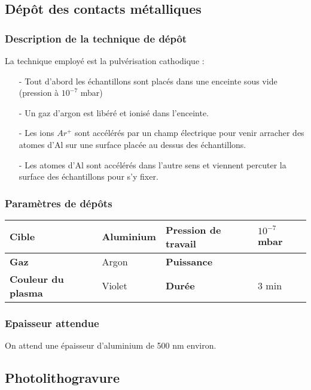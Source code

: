 \documentclass[11pt]{article}
\begin{document}
\subsection{D\'ep\^ot des contacts m\'etalliques}

\subsubsection{Description de la technique de d\'ep\^ot} 

La technique employ\'e est la pulv\'erisation cathodique :
\begin{itemize} \itemsep -2pt
\item[-] Tout d'abord les \'echantillons sont plac\'es dans une enceinte sous vide (pression \`a $10^{-7}$ mbar)
\item[-] Un gaz d'argon est lib\'er\'e et ionis\'e dans l'enceinte. 
\item[-] Les ions $Ar^{+}$ sont acc\'el\'er\'es par un champ \'electrique pour venir arracher des atomes d'Al sur une surface plac\'ee au dessus des \'echantillons. 
\item[-] Les atomes d'Al sont acc\'el\'er\'es dans l'autre sens et viennent percuter la surface des \'echantillons pour s'y fixer.
\end{itemize}

\subsubsection{Param\`etres de d\'ep\^ots}

    \noindent \begin{tabular}[!htb]{ | p{4cm} | p{3.5cm} | p{3.5cm} | p{3.5cm} | }
    \hline
    \textbf{Cible} & Aluminium & \textbf{Pression de travail} & $10^{-7}$ mbar\\ \hline
    \textbf{Gaz} & Argon & \textbf{Puissance} &\\ \hline
    \textbf{Couleur du plasma} & Violet & \textbf{Dur\'ee} & 3 min\\
    \hline
    \end{tabular}

\subsubsection{Epaisseur attendue}
    On attend une \'epaisseur d'aluminium de 500 nm environ.

\subsection{Photolithogravure}
\end{document}
